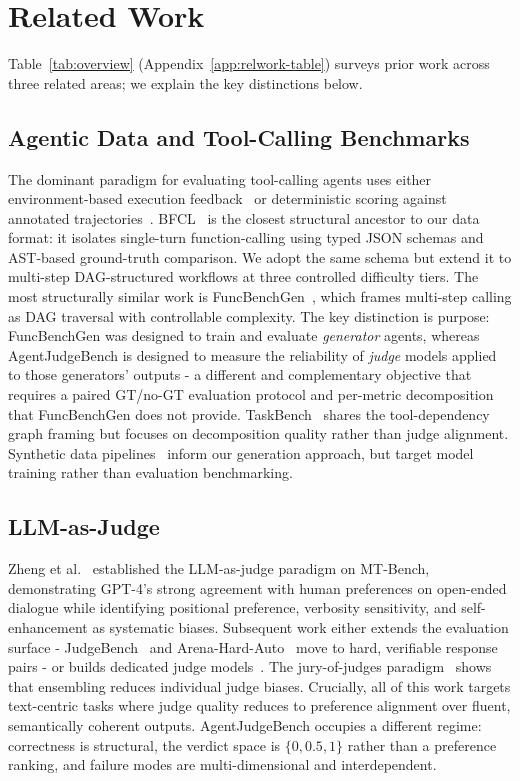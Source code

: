 \section{Related Work}

Table~\ref{tab:overview} (Appendix~\ref{app:relwork-table}) surveys prior work across three related areas; we explain the key distinctions below.

\subsection{Agentic Data and Tool-Calling Benchmarks}
The dominant paradigm for evaluating tool-calling agents uses either environment-based execution feedback~\cite{zhou2024webarena,drouin2024workarena,trivedi2024appworld} or deterministic scoring against annotated trajectories~\cite{deng2023mind2web,xu2025agenttrek,patil2025bfcl}. BFCL~\cite{patil2025bfcl} is the closest structural ancestor to our data format: it isolates single-turn function-calling using typed JSON schemas and AST-based ground-truth comparison. We adopt the same schema but extend it to multi-step DAG-structured workflows at three controlled difficulty tiers. The most structurally similar work is FuncBenchGen~\cite{funcbenchgen2025}, which frames multi-step calling as DAG traversal with controllable complexity. The key distinction is purpose: FuncBenchGen was designed to train and evaluate \emph{generator} agents, whereas AgentJudgeBench is designed to measure the reliability of \emph{judge} models applied to those generators' outputs - a different and complementary objective that requires a paired GT/no-GT evaluation protocol and per-metric decomposition that FuncBenchGen does not provide. TaskBench~\cite{shen2024taskbench} shares the tool-dependency graph framing but focuses on decomposition quality rather than judge alignment. Synthetic data pipelines~\cite{wang2022selfinstruct,xu2024magpie,cui2024ultrafeedback} inform our generation approach, but target model training rather than evaluation benchmarking.

\subsection{LLM-as-Judge}
Zheng et al.~\cite{zheng2023judging} established the LLM-as-judge paradigm on MT-Bench, demonstrating GPT-4's strong agreement with human preferences on open-ended dialogue while identifying positional preference, verbosity sensitivity, and self-enhancement as systematic biases. Subsequent work either extends the evaluation surface - JudgeBench~\cite{tan2024judgebench} and Arena-Hard-Auto~\cite{li2024arenahard} move to hard, verifiable response pairs - or builds dedicated judge models~\cite{wang2024pandalm,li2024autoj}. The jury-of-judges paradigm~\cite{verga2024jury} shows that ensembling reduces individual judge biases. Crucially, all of this work targets text-centric tasks where judge quality reduces to preference alignment over fluent, semantically coherent outputs. AgentJudgeBench occupies a different regime: correctness is structural, the verdict space is $\{0, 0.5, 1\}$ rather than a preference ranking, and failure modes are multi-dimensional and interdependent.

